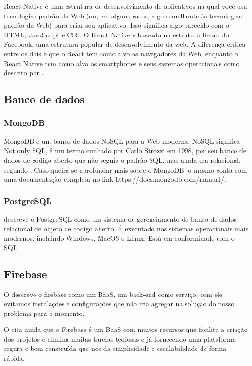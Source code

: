  React Native é uma estrutura de desenvolvimento de aplicativos na qual você usa tecnologias padrão da Web (ou, em alguns casos, algo semelhante às tecnologias padrão da Web) para criar seu aplicativo. Isso significa algo parecido com o HTML, JavaScript e CSS. O React Native é baseado na estrutura React do Facebook, uma estrutura popular de desenvolvimento da web. A diferença crítica entre os dois é que o React tem como alvo os navegadores da Web, enquanto o React Native tem como alvo os smartphones e seus sistemas operacionais como descrito por \cite{Zammetti2018}.

\subsection{Banco de dados}

\subsubsection{ MongoDB }

MongoDB é um banco de dados NoSQL para a Web moderna. NoSQL significa Not only SQL, é um termo cunhado por Carlo Strozzi em 1998, por seu banco de dados de código aberto que não seguia o padrão SQL, mas ainda era relacional, segundo \cite{Giamas2019}. Caso queira se aprofundar mais sobre o MongoDB, o mesmo conta com uma documentação completa no link https://docs.mongodb.com/manual/.

\subsubsection{ PostgreSQL }

\cite{Volkov2017} descreve o PostgreSQL como um sistema de gerenciamento de banco de dados relacional de objeto de código aberto. É executado nos sistemas operacionais mais modernos, incluindo Windows, MacOS e Linux. Está em conformidade com o SQL.

\subsection{Firebase}

O \cite{Yahiaoui2017} descreve o firebase como um BaaS, um back-end como serviço, com ele evitamos instalações e configurações que não iria agregar na solução do nosso problema para o momento.

O \cite{Yahiaoui2017} cita ainda que o Firebase é um BaaS com muitos recursos que facilita a criação dos projetos e elimina muitas tarefas tediosas e já fornecendo uma plataforma segura e bem construída que nos da simplicidade e escalabilidade de forma rápida.

